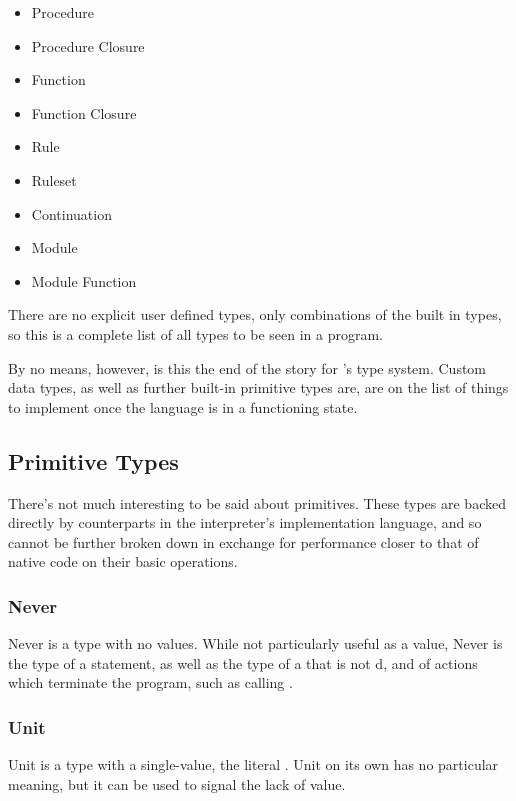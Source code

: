 \begin{itemize}
    \item Procedure
    \item Procedure Closure
    \item Function
    \item Function Closure
    \item Rule
    \item Ruleset
    \item Continuation
    \item Module
    \item Module Function
\end{itemize}

\noindent
There are no explicit user defined types, only combinations of the built in
types, so this is a complete list of all types to be seen in a \Trilogy{}
program.

By no means, however, is this the end of the story for \Trilogy{}'s type
system. Custom data types, as well as further built-in primitive types are,
are on the list of things to implement once the language is in a functioning
state.

\subsection{Primitive Types}

There's not much interesting to be said about primitives. These types are
backed directly by counterparts in the interpreter's implementation language,
and so cannot be further broken down in exchange for performance closer to
that of native code on their basic operations.

\subsubsection{Never}

Never is a type with no values. While not particularly useful as a value,
Never is the type of a  statement, as well as the type of
a  that is not d, and of actions which terminate the
program, such as calling .

\subsubsection{Unit}

Unit is a type with a single-value, the literal . Unit on its own
has no particular meaning, but it can be used to signal the lack of value.

